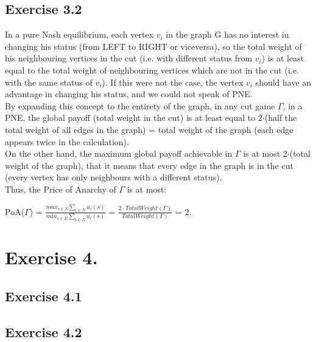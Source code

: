 \documentclass[11pt]{scrartcl}
\begin{document}
\subsection{Exercise 3.2}
In a pure Nash equilibrium, each vertex $v_i$ in the graph G has no interest in changing his status (from LEFT to RIGHT or viceversa), so the total weight of his neighbouring vertices in the cut (i.e. with different status from $v_i$) is at least equal to the total weight of neighbouring vertices which are not in the cut (i.e. with the same status of $v_i$). If this were not the case, the vertex $v_i$ should have an advantage in changing his status, and we could not speak of PNE.\\
By expanding this concept to the entirety of the graph, in any cut game $\Gamma$, in a PNE, the global payoff (total weight in the cut) is at least equal to 2$\cdot$(half the total weight of all edges in the graph) = total weight of the graph (each edge appears twice in the calculation).\\
On the other hand, the maximum global payoff achievable in $\Gamma$ is at most 2$\cdot$(total weight of the graph), that it means that every edge in the graph is in the cut (every vertex has only neighbours with a different status).\\
Thus, the Price of Anarchy of $\Gamma$ is at most:\\
\begin{center}
PoA($\Gamma$) = $\frac{max_{s \in S} \sum_{i\in N} u_i(s)}{min_{s \in E} \sum_{i\in N} u_i(s)}$ = $\frac{2\cdot TotalWeight(\Gamma)}{TotalWeight(\Gamma)}$ = 2.
\end{center}
\section{Exercise 4.}
\subsection{Exercise 4.1}
\vspace{-0.2cm}
\subsection{Exercise 4.2}
\vspace{-0.4cm}
\end{document}
